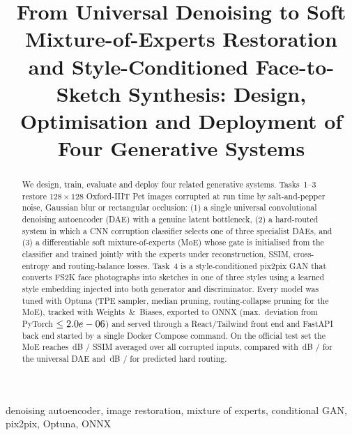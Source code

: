 \documentclass[conference]{IEEEtran}
\begin{document}
\title{From Universal Denoising to Soft Mixture-of-Experts Restoration and Style-Conditioned Face-to-Sketch Synthesis: Design, Optimisation and Deployment of Four Generative Systems}

\author{\IEEEauthorblockN{\AUTHORNAME}
}

\maketitle

\begin{abstract}
We design, train, evaluate and deploy four related generative systems. Tasks~1--3 restore $128\times128$ Oxford-IIIT Pet images corrupted at run time by salt-and-pepper noise, Gaussian blur or rectangular occlusion: (1) a single universal convolutional denoising autoencoder (DAE) with a genuine latent bottleneck, (2) a hard-routed system in which a CNN corruption classifier selects one of three specialist DAEs, and (3) a differentiable soft mixture-of-experts (MoE) whose gate is initialised from the classifier and trained jointly with the experts under reconstruction, SSIM, cross-entropy and routing-balance losses. Task~4 is a style-conditioned pix2pix GAN that converts FS2K face photographs into sketches in one of three styles using a learned style embedding injected into both generator and discriminator. Every model was tuned with Optuna (TPE sampler, median pruning, routing-collapse pruning for the MoE), tracked with Weights~\&~Biases, exported to ONNX (max.\ deviation from PyTorch $\le2.0e-06$) and served through a React/Tailwind front end and FastAPI back end started by a single Docker Compose command. On the official test set the MoE reaches \MOEPSNRCORR\,dB / \MOESSIMCORR{} SSIM averaged over all corrupted inputs, compared with \TONEPSNRCORR\,dB / \TONESSIMCORR{} for the universal DAE and \PREDPSNRCORR\,dB / \PREDSSIMCORR{} for predicted hard routing.
\end{abstract}

\begin{IEEEkeywords}
denoising autoencoder, image restoration, mixture of experts, conditional GAN, pix2pix, Optuna, ONNX
\end{IEEEkeywords}
\end{document}
